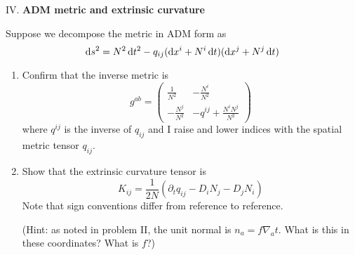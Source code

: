 \bigbreak\noindent{}IV. \textbf{ADM metric and extrinsic curvature}\bigbreak

Suppose we decompose the metric in ADM form as
\begin{equation*}
\mathrm{d} s^{2} = N^{2}\,\mathrm{d} t^{2} - q_{ij}(\mathrm{d} x^{i} + N^{i}\,\mathrm{d} t)(\mathrm{d} x^{j} + N^{j}\,\mathrm{d} t)
\end{equation*}
\begin{enumerate}[label=(\alph*),nosep]
\item Confirm that the inverse metric is
  $$g^{ab} = \begin{pmatrix}\frac{1}{N^{2}} & -\frac{N^{i}}{N^{2}}\\-\frac{N^{j}}{N^{2}} & -q^{ij} + \frac{N^{i}N^{j}}{N^{2}} \end{pmatrix}$$
  where $q^{ij}$ is the inverse of $q_{ij}$ and I raise and lower
  indices with the spatial metric tensor $q_{ij}$.
\item Show that the extrinsic curvature tensor is
  \begin{equation*}
K_{ij} = \frac{1}{2N}\left(\partial_{t}q_{ij} - D_{i}N_{j} - D_{j}N_{i}\right)
  \end{equation*}
  Note that sign conventions differ from reference to reference.

  (Hint: as noted in problem II, the unit normal is $n_{a} = f\nabla_{a}t$. What is this in these coordinates? What is $f$?)
\end{enumerate}
